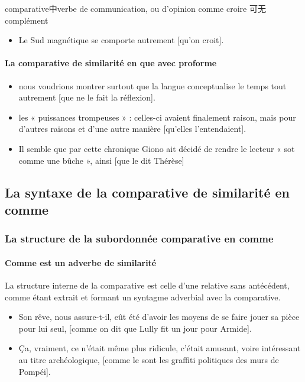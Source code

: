 \documentclass[UTF8]{report}
\begin{document}
comparative中verbe de communication, ou d’opinion comme croire 可无 complément 
\begin{itemize}
    \item Le Sud magnétique se comporte autrement [qu’on croit].
\end{itemize}

\paragraph{La comparative de similarité en que avec proforme}

\begin{itemize}
    \item nous voudrions montrer surtout que la langue conceptualise le temps tout autrement [que ne le fait la réflexion].
    \item les « puissances trompeuses » : celles-ci avaient finalement raison, mais pour d’autres raisons et d’une autre manière [qu’elles l’entendaient].
    \item Il semble que par cette chronique Giono ait décidé de rendre le lecteur « sot comme une bûche », ainsi [que le dit Thérèse]
\end{itemize}

\subsection{La syntaxe de la comparative de similarité en comme}
\subsubsection{La structure de la subordonnée comparative en comme}

\paragraph{Comme est un adverbe de similarité}
La structure interne de la comparative est celle d’une relative sans antécédent, comme étant extrait et formant un syntagme adverbial avec la comparative.

\begin{itemize}
    \item Son rêve, nous assure-t-il, eût été d’avoir les moyens de se faire jouer sa pièce pour lui seul, [comme on dit que Lully fit un jour pour Armide].
    \item Ça, vraiment, ce n’était même plus ridicule, c’était amusant, voire intéressant au titre archéologique, [comme le sont les graffiti politiques des murs de Pompéi].
\end{itemize}
\end{document}
